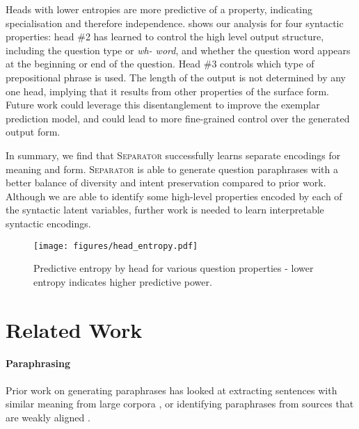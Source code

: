 \documentclass[11pt,a4paper]{article}
\begin{document}
Heads with lower entropies are more predictive of a property,
indicating specialisation and therefore
independence.  shows our analysis for four
syntactic properties: head \#2 has learned to control the high level
output structure, including the question type or \textit{wh- word},
and whether the question word appears at the beginning or end of the
question. Head \#3 controls which type of prepositional phrase is
used. The length of the output is not determined by any one head,
implying that it results from other properties of the surface form.
Future work could leverage this disentanglement to improve the exemplar prediction model, and could lead to more fine-grained control over the generated output form.


In summary, we find that \textsc{Separator} successfully learns separate encodings for meaning and form. \textsc{Separator} is able to generate question paraphrases with a better balance of diversity and intent preservation compared to prior work. Although we are able to identify some high-level properties encoded by each of the syntactic latent variables, further work is needed to learn interpretable syntactic encodings.

\begin{figure}[t]
    \centering
    \texttt{[image: figures/head\_entropy.pdf]}
\vspace*{-.3cm}
    \caption{Predictive entropy by head for various question properties - lower entropy indicates higher predictive power. }
    \label{fig:headentropy}
\end{figure}














\section{Related Work}

\paragraph{Paraphrasing}

Prior work on generating paraphrases has looked at extracting
sentences with similar meaning from large corpora
\cite{barzilay-mckeown-2001-extracting,bannard-callison-burch-2005-paraphrasing,ganitkevitch-etal-2013-ppdb},
or identifying paraphrases from sources that are weakly aligned
\cite{dolan-etal-2004-unsupervised,coster-kauchak-2011-simple}.
\end{document}
